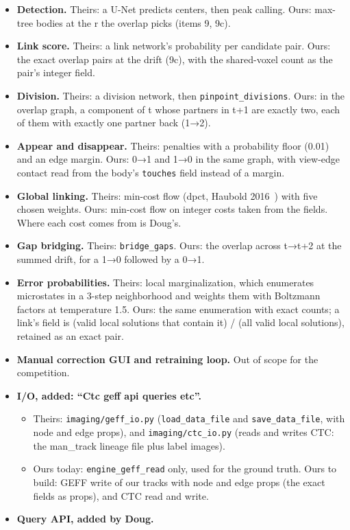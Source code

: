 \begin{itemize}
\item \textbf{Detection.} Theirs: a U-Net predicts centers, then peak calling. Ours: max-tree bodies at the r the overlap picks (items 9, 9c).
\item \textbf{Link score.} Theirs: a link network's probability per candidate pair. Ours: the exact overlap pairs at the drift (9c), with the shared-voxel count as the pair's integer field.
\item \textbf{Division.} Theirs: a division network, then \texttt{pinpoint\_\allowbreak{}divisions}. Ours: in the overlap graph, a component of t whose partners in t+1 are exactly two, each of them with exactly one partner back (1→2).
\item \textbf{Appear and disappear.} Theirs: penalties with a probability floor (0.01) and an edge margin. Ours: 0→1 and 1→0 in the same graph, with view-edge contact read from the body's \texttt{touches} field instead of a margin.
\item \textbf{Global linking.} Theirs: min-cost flow (dpct, Haubold 2016~\cite{src:Haubold-2016}) with five chosen weights. Ours: min-cost flow on integer costs taken from the fields. Where each cost comes from is Doug's.
\item \textbf{Gap bridging.} Theirs: \texttt{bridge\_\allowbreak{}gaps}. Ours: the overlap across t→t+2 at the summed drift, for a 1→0 followed by a 0→1.
\item \textbf{Error probabilities.} Theirs: local marginalization, which enumerates microstates in a 3-step neighborhood and weights them with Boltzmann factors at temperature 1.5. Ours: the same enumeration with exact counts; a link's field is (valid local solutions that contain it) / (all valid local solutions), retained as an exact pair.
\item \textbf{Manual correction GUI and retraining loop.} Out of scope for the competition.
\item \textbf{I/O, added: “Ctc geff api queries etc”.}

\begin{itemize}
\item Theirs: \texttt{imaging/\allowbreak{}geff\_\allowbreak{}io.\allowbreak{}py} (\texttt{load\_\allowbreak{}data\_\allowbreak{}file} and \texttt{save\_\allowbreak{}data\_\allowbreak{}file}, with node and edge props), and \texttt{imaging/\allowbreak{}ctc\_\allowbreak{}io.\allowbreak{}py} (reads and writes CTC: the man\_\allowbreak{}track lineage file plus label images).
\item Ours today: \texttt{engine\_\allowbreak{}geff\_\allowbreak{}read} only, used for the ground truth. Ours to build: GEFF write of our tracks with node and edge props (the exact fields as props), and CTC read and write.
\end{itemize}
\item \textbf{Query API, added by Doug.}


\end{itemize}
